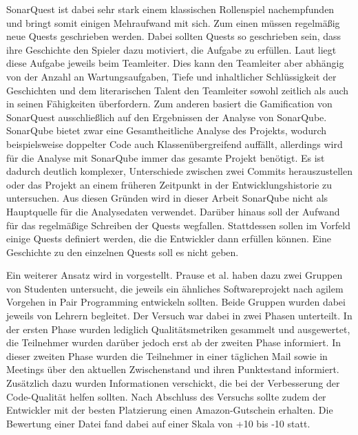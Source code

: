 \documentclass[
	oneside,  %
	ngerman, 
	final, 
	11pt, 
	a4paper, 
	1.1headlines, 
	headinclude=false, 
	footinclude=false, 
	mpinclude=false, 
	pagesize, 
	onecolumn, 
	titlepage, 
	parskip=half, 
	headsepline, 
	chapterprefix=false, 
	version=first, 
	listof=totoc, 
	bibliography=totoc, 
	toc=graduated, 
	fleqn
]{scrbook}
\begin{document}
SonarQuest ist dabei sehr stark einem klassischen Rollenspiel nachempfunden und bringt somit einigen Mehraufwand mit sich.
Zum einen müssen regelmäßig neue Quests geschrieben werden.
Dabei sollten Quests so geschrieben sein, dass ihre Geschichte den Spieler dazu motiviert, die Aufgabe zu erfüllen.
Laut \cite{SonarQuest} liegt diese Aufgabe jeweils beim Teamleiter.
Dies kann den Teamleiter aber abhängig von der Anzahl an Wartungsaufgaben, Tiefe und inhaltlicher Schlüssigkeit der Geschichten und dem literarischen Talent den Teamleiter sowohl zeitlich als auch in seinen Fähigkeiten überfordern.
Zum anderen basiert die Gamification von SonarQuest ausschließlich auf den Ergebnissen der Analyse von SonarQube.
SonarQube bietet zwar eine Gesamtheitliche Analyse des Projekts, wodurch beispielsweise doppelter Code auch Klassenübergreifend auffällt, allerdings wird für die Analyse mit SonarQube immer das gesamte Projekt benötigt.
Es ist dadurch deutlich komplexer, Unterschiede zwischen zwei Commits herauszustellen oder das Projekt an einem früheren Zeitpunkt in der Entwicklungshistorie zu untersuchen.
Aus diesen Gründen wird in dieser Arbeit SonarQube nicht als Hauptquelle für die Analysedaten verwendet.
Darüber hinaus soll der Aufwand für das regelmäßige Schreiben der Quests wegfallen.
Stattdessen sollen im Vorfeld einige Quests definiert werden, die die Entwickler dann erfüllen können.
Eine Geschichte zu den einzelnen Quests soll es nicht geben.

Ein weiterer Ansatz wird in \cite{Prause2012} vorgestellt. 
Prause et al. haben dazu zwei Gruppen von Studenten untersucht, die jeweils ein ähnliches Softwareprojekt nach agilem Vorgehen in Pair Programming entwickeln sollten.
Beide Gruppen wurden dabei jeweils von Lehrern begleitet.
Der Versuch war dabei in zwei Phasen unterteilt.
In der ersten Phase wurden lediglich Qualitätsmetriken gesammelt und ausgewertet, die Teilnehmer wurden darüber jedoch erst ab der zweiten Phase informiert.
In dieser zweiten Phase wurden die Teilnehmer in einer täglichen Mail sowie in Meetings über den aktuellen Zwischenstand und ihren Punktestand informiert.
Zusätzlich dazu wurden Informationen verschickt, die bei der Verbesserung der Code-Qualität helfen sollten.
Nach Abschluss des Versuchs sollte zudem der Entwickler mit der besten Platzierung einen Amazon-Gutschein erhalten.
Die Bewertung einer Datei fand dabei auf einer Skala von +10 bis -10 statt.
\end{document}
